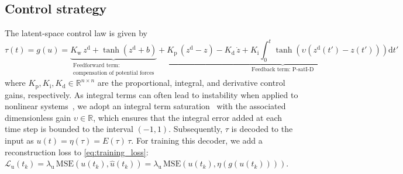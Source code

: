 \subsection{Control strategy}
The latent-space control law is given by
\begin{equation}\label{eq:con:controller}
    \tau(t) = g(u) = \underbrace{K_\mathrm{w} \, z^\mathrm{d} + \tanh(z^\mathrm{d} + b)}_{\substack{\text{Feedforward term:}\\ \text{compensation of potential forces}}} + \underbrace{K_\mathrm{p} \, (z^\mathrm{d} - z) - K_\mathrm{d} \, \dot{z} + K_\mathrm{i} \int_0^t \tanh(\upsilon (z^\mathrm{d}(t') - z(t')))\mathrm{d}t'}_{\text{Feedback term: P-satI-D}}
\end{equation}
where $K_\mathrm{p}, K_\mathrm{i}, K_\mathrm{d} \in \mathbb{R}^{n \times n}$ are the proportional, integral, and derivative control gains, respectively.
As integral terms can often lead to instability when applied to nonlinear systems~\citep{stolzle2024experimental}, we adopt an integral term saturation~\citep{pustina2022p} with the associated dimensionless gain $\upsilon \in \mathbb{R}$, which ensures that the integral error added at each time step is bounded to the interval $(-1, 1)$.
% 
Subsequently, $\tau$ is  decoded to the input as $u(t) = \eta(\tau) = E(\tau) \, \tau$.
For training this decoder, we add a reconstruction loss to \eqref{eq:training_loss}: $\mathcal{L}_{\mathrm{u}}(t_k) = \lambda_{\mathrm{u}} \, \mathrm{MSE}(u(t_k), \hat{u}(t_k)) = \lambda_{\mathrm{u}} \, \mathrm{MSE} \left (u(t_k), \eta(g(u(t_k))) \right )$.

